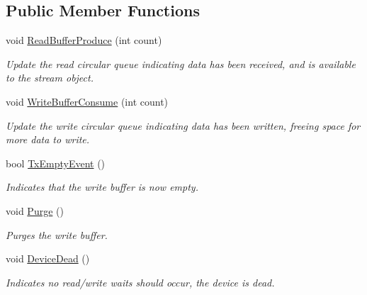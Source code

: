 \subsection*{Public Member Functions}
\begin{DoxyCompactItemize}
\item 
void \mbox{\hyperlink{interface_r_j_c_p_1_1_i_o_1_1_ports_1_1_native_1_1_i_serial_buffer_serial_data_a38c6f3c1c30d3a2c9e03f5c76bc0809c}{Read\+Buffer\+Produce}} (int count)
\begin{DoxyCompactList}\small\item\em Update the read circular queue indicating data has been received, and is available to the stream object. \end{DoxyCompactList}\item 
void \mbox{\hyperlink{interface_r_j_c_p_1_1_i_o_1_1_ports_1_1_native_1_1_i_serial_buffer_serial_data_a311167fad010dfdfb43433e7980f96b9}{Write\+Buffer\+Consume}} (int count)
\begin{DoxyCompactList}\small\item\em Update the write circular queue indicating data has been written, freeing space for more data to write. \end{DoxyCompactList}\item 
bool \mbox{\hyperlink{interface_r_j_c_p_1_1_i_o_1_1_ports_1_1_native_1_1_i_serial_buffer_serial_data_a657802355ea0d81eb1938af0cb2927c8}{Tx\+Empty\+Event}} ()
\begin{DoxyCompactList}\small\item\em Indicates that the write buffer is now empty. \end{DoxyCompactList}\item 
void \mbox{\hyperlink{interface_r_j_c_p_1_1_i_o_1_1_ports_1_1_native_1_1_i_serial_buffer_serial_data_ab17e6fb6b16b99edfce8caaa0cca8220}{Purge}} ()
\begin{DoxyCompactList}\small\item\em Purges the write buffer. \end{DoxyCompactList}\item 
void \mbox{\hyperlink{interface_r_j_c_p_1_1_i_o_1_1_ports_1_1_native_1_1_i_serial_buffer_serial_data_a1b24707b45bce02373256166d7e2edbf}{Device\+Dead}} ()
\begin{DoxyCompactList}\small\item\em Indicates no read/write waits should occur, the device is dead. \end{DoxyCompactList}\end{DoxyCompactItemize}
